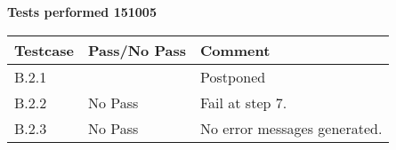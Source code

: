 \renewcommand{\testdate}{151005}
\textbf{Tests performed \testdate}
\begin{center}
  		\begin{tabular}{| p{3cm} | p{5cm} | p{5cm} |}
    		\hline
	    	\textbf{Testcase}			& \textbf{Pass/No Pass} 	& \textbf{Comment} \\ \hline
    		B.2.1		 						& 									& Postponed 				\\ \hline
    		B.2.2		 						& No Pass 										& Fail at step 7.				 \\	\hline
    		B.2.3		 						& No Pass 										& No error messages generated.				 \\	\hline
 		\end{tabular}
\end{center}